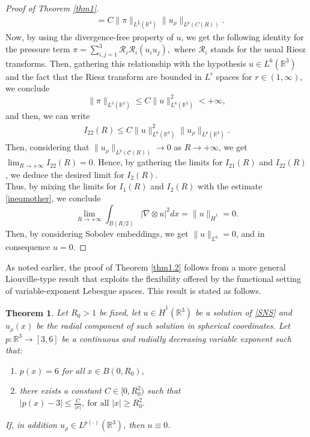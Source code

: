 \documentclass[a4paper,12pt]{amsart}
\theoremstyle{definition}
\theoremstyle{plain}
\newtheorem{theorem}{Theorem}[section]
\def\R{\mathbb{R}}
\def\R{\mathbb R}
\def\vu{ u }
\def\vn{ \nabla }
\begin{document}
\begin{proof}[Proof of Theorem \ref{thm1}]
\begin{align}
&=
 C 
\|\pi \|_{L^{\frac{6 }{2}}( \R^3  )}\| \vu_\rho \|_{L^{p}(  C( R) )}
.%
\end{align}
%
Now,  by using the divergence-free property of $\vu$, we get the following identity for the pressure term
$ \displaystyle{\pi=\sum_{i,j=1}^3\mathcal{R}_i\mathcal{R}_i(u_iu_j)}
,
$ 
where $\mathcal{R}_i$ stands for the usual Riesz transforms.
Then, gathering this relationship with the hypothesis $\vu\in L^{6}(\R^3 )$ and the fact that 
 the Riesz transform are bounded in $L^{r}$ spaces for $r\in (1,\infty)$,  we  conclude   
  \begin{equation}
  \|\pi \|_{L^{ 3}( \R^3 )} \leq 
  C 
    \|u \|^2_{L^{ 6}( \R^3 )  } <+\infty
 ,
  \end{equation}
and then, we can write  
    \begin{align}
I_{22}(R)\leq 
 C  
 \|\vu \|^2_{L^{6}( \R^3 )}
\| \vu_\rho \|_{L^{p}( \R^3 )}
.
\end{align}
Then, considering that   
$\|\vu_\rho\|_{L^{p}( \mathcal{C}( R)   )}\to 0$ as  $R\to +\infty$, 
we get  $ \lim_{R\to +\infty}
I_{22}(R) 
=0$.  Hence, by gathering the limits for $I_{21}(R)$ and $I_{22}(R)$, we deduce the desired limit for $I_{2}(R) $.\\


Thus, by mixing
  the limits for $I_{1}(R)$ and $I_{2}(R)$ with the estimate \eqref{ineqmother}, we conclude
\begin{equation}\label{LimiteSobolev}
\lim_{R\to +\infty}\int_{B(R/2)}|\vn \otimes \vu|^2 dx=\|\vu\|_{\dot{H}^1}=0.
\end{equation}
Then, by considering Sobolev embeddings, we get $\|\vu\|_{L^6}=0$, and in consequence  $\vu= 0$. 
\end{proof}
 



As noted earlier, the proof of Theorem \ref{thm1.2} follows from a more general Liouville-type result that exploits the flexibility offered by the functional setting of variable-exponent Lebesgue spaces. This result is stated as follows.

\begin{theorem}\label{prop.1}
Let $R_0 > 1$ be fixed, let $u \in \dot{H}^1(\mathbb{R}^3)$ be a solution of \eqref{SNS} and $u_\rho(x)$ be the radial component of such solution in spherical coordinates. Let $p:\mathbb{R}^3 \to [3,6]$ be a continuous and radially decreasing variable exponent such that:
\begin{enumerate}
\item $p(x) = 6$ for all $x \in B(0,R_0)$,
\item there exists a constant $C \in [0, R_0^2)$ such that
$
|p(x) - 3| \le \frac{C}{|x|}, \  \text{for all } |x| \ge R_0^2.
$
\end{enumerate}
If, in addition  $u_\rho \in L^{p(\cdot)}(\mathbb{R}^3)$, then $u \equiv 0$.
\end{theorem}
\end{document}
